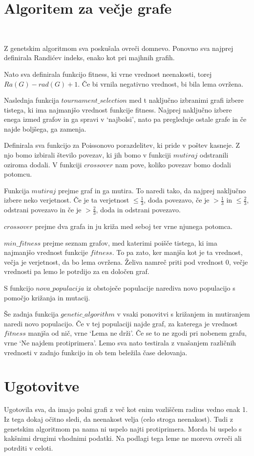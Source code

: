 \documentclass[a4paper, 10pt]{article}
\begin{document}
\pagebreak
\section{Algoritem za večje grafe}
\

Z genetskim algoritmom sva poskušala ovreči domnevo.
Ponovno sva najprej definirala Randićev indeks, enako kot pri majhnih grafih.

Nato sva definirala funkcijo fitness, ki vrne vrednost neenakosti, torej $Ra(G)-rad(G)+1$. Če bi vrnila negativno vrednost, bi bila lema ovržena.

Naslednja funkcija $tournament\_selection$  med t naključno izbranimi grafi izbere tistega, ki ima najmanjšo vrednost funkcije fitness. Najprej naključno izbere enega izmed grafov in ga spravi v `najbolsi', nato pa pregleduje ostale grafe in če najde boljšega, ga zamenja.

Definirala sva funkcijo za Poissonovo porazdelitev, ki pride v poštev kasneje. Z njo bomo izbirali število povezav, ki jih bomo v funkciji $mutiraj$ odstranili oziroma dodali. V funkciji $crossover$ nam pove, koliko povezav bomo dodali potomcu.

Funkcija $mutiraj$ prejme graf in ga mutira. To naredi tako, da najprej naključno izbere neko verjetnost. Če je ta verjetnost $\leq\frac{1}{3}$, doda povezavo, če je  $> \frac{1}{3}$ in $\leq \frac{2}{3}$, odstrani povezavo in če je $> \frac{2}{3}$, doda in odstrani povezavo.

$crossover$ prejme dva grafa in ju križa med seboj ter vrne njunega potomca.

$min\_fitness$ prejme seznam grafov, med katerimi poišče tistega, ki ima najmanjšo vrednost funkcije $fitness$. To pa zato, ker manjša kot je ta vrednost, večja je verjetnost, da bo lema ovržena. Želiva namreč priti pod vrednost 0, večje vrednosti pa lemo le potrdijo za en določen graf.

S funkcijo $nova\_populacija$ iz obstoječe populacije narediva novo populacijo s pomočjo križanja in mutacij.

Še zadnja funkcija $genetic\_algorithm$ v vsaki ponovitvi s križanjem in mutiranjem naredi novo populacijo. Če v tej populaciji najde graf, za katerega je vrednost $fitness$ manjša od nič, vrne `Lema ne drži'. Če se to ne zgodi pri nobenem grafu, vrne `Ne najdem protiprimera'. Lemo sva nato testirala z vnašanjem različnih vrednosti v zadnjo funkcijo in ob tem beležila čase delovanja.

\section{Ugotovitve}
Ugotovila sva, da imajo polni grafi z več kot enim vozliščem radius vedno enak 1. Iz tega dokaj očitno sledi, da neenakost velja (celo stroga neenakost).
Tudi z genetskim algoritmom pa nama ni uspelo najti protiprimera. Morda bi uspelo s kakšnimi drugimi vhodnimi podatki.
Na podlagi tega leme ne moreva ovreči ali potrditi v celoti.
\end{document}

